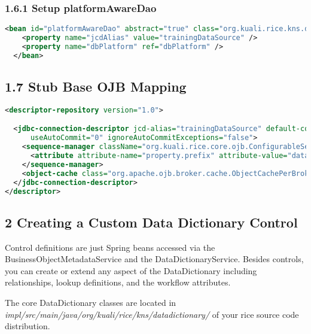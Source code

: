 \subsubsection*{1.6.1 Setup platformAwareDao}
\begin{lstlisting}[language=xml,backgroundcolor=\color{ubergray},caption={Spring
    datasource setup src/main/resources/training/OJB-repository-bookstore.xml},frame=single,breaklines=true]
  <bean id="platformAwareDao" abstract="true" class="org.kuali.rice.kns.dao.impl.PlatformAwareDaoBaseOjb">
    <property name="jcdAlias" value="trainingDataSource" />
    <property name="dbPlatform" ref="dbPlatform" />
  </bean>
\end{lstlisting}

\subsection*{1.7 Stub Base OJB Mapping}
\begin{lstlisting}[language=xml,backgroundcolor=\color{ubergray},caption={Stubbed
  OJB Descriptor file src/main/resources/OJB-repository-training.xml},frame=single,breaklines=true]
<descriptor-repository version="1.0">

  <jdbc-connection-descriptor jcd-alias="trainingDataSource" default-connection="false" jdbc-level="3.0" eager-release="false" batch-mode="false"
      useAutoCommit="0" ignoreAutoCommitExceptions="false">
    <sequence-manager className="org.kuali.rice.core.ojb.ConfigurableSequenceManager">
      <attribute attribute-name="property.prefix" attribute-value="datasource.ojb.sequenceManager" />
    </sequence-manager>
    <object-cache class="org.apache.ojb.broker.cache.ObjectCachePerBrokerImpl" />
  </jdbc-connection-descriptor>
</descriptor>
\end{lstlisting}

\subsection*{2 Creating a Custom Data Dictionary Control}
Control definitions are just Spring beans accessed via the
BusinessObjectMetadataService and the DataDictionaryService. Besides
controls, you can create or extend any aspect of the DataDictionary
including relationships, lookup definitions, and the workflow
attributes.

The core DataDictionary classes are located in
\emph{impl/src/main/java/org/kuali/rice/kns/datadictionary/} of your
rice source code distribution.


